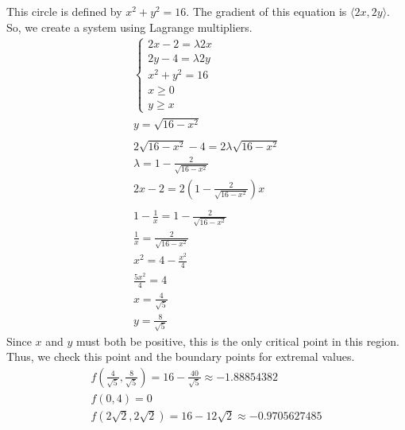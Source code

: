 \documentclass[12pt]{exam}
\begin{document}
\begin{questions}
\begin{parts}
\begin{solution}
                This circle is defined by $x^2 + y^2 = 16$. The gradient of this equation is $\langle 2x, 2y \rangle$. So, we create a system using Lagrange multipliers.
                \begin{gather*}
                    \begin{cases*}
                        2x - 2 = \lambda 2x \\
                        2y - 4 = \lambda 2y \\
                        x^2 + y^2 = 16 \\
                        x \geq 0 \\
                        y \geq x
                    \end{cases*} \\
                    y = \sqrt{16 - x^2} \\\\
                    2\sqrt{16 - x^2} - 4 = 2\lambda \sqrt{16 - x^2} \\
                    \lambda = 1 - \frac{2}{\sqrt{16 - x^2}} \\
                    2x - 2 = 2\left(1 - \frac{2}{\sqrt{16 - x^2}}\right)x \\\\
                    1 - \frac{1}{x} = 1 - \frac{2}{\sqrt{16 - x^2}} \\
                    \frac{1}{x} = \frac{2}{\sqrt{16 - x^2}} \\
                    x^2 = 4 - \frac{x^2}{4} \\
                    \frac{5x^2}{4} = 4 \\
                    x = \frac{4}{\sqrt{5}} \\
                    y = \frac{8}{\sqrt{5}}
                \end{gather*}
                Since $x$ and $y$ must both be positive, this is the only critical point in this region. Thus, we check this point and the boundary points for extremal values.
                \begin{gather*}
                    \boxed{f(\frac{4}{\sqrt{5}}, \frac{8}{\sqrt{5}}) = 16 - \frac{40}{\sqrt{5}} \approx -1.88854382} \\
                    \boxed{f(0, 4) = 0} \\
                    f(2\sqrt{2}, 2\sqrt{2}) = 16 - 12\sqrt{2} \approx -0.9705627485 \tag*{\qed}
                \end{gather*}
            \end{solution}

\end{parts}
\end{questions}
\end{document}
